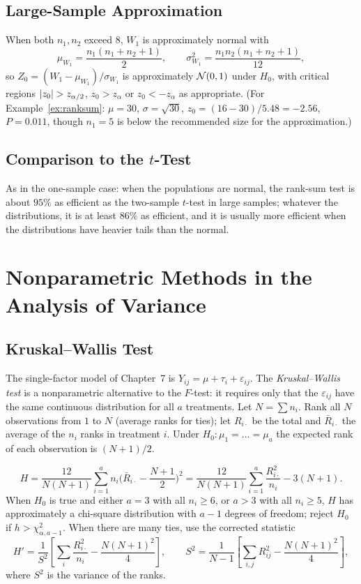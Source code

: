 \subsection{Large-Sample Approximation}

When both $n_1,n_2$ exceed $8$, $W_1$ is approximately normal with
\[ \mu_{W_1}=\frac{n_1(n_1+n_2+1)}2,\qquad\sigma^2_{W_1}=\frac{n_1n_2(n_1+n_2+1)}{12}, \]
so $Z_0=(W_1-\mu_{W_1})/\sigma_{W_1}$ is approximately $\mathcal{N}(0,1)$ under $H_0$, with critical regions $\lvert z_0\rvert>z_{\alpha/2}$, $z_0>z_\alpha$ or $z_0<-z_\alpha$ as appropriate. (For Example~\ref{ex:ranksum}: $\mu=30$, $\sigma=\sqrt{30}$, $z_0=(16-30)/5.48=-2.56$, $P=0.011$, though $n_1=5$ is below the recommended size for the approximation.)

\subsection{Comparison to the $t$-Test}

As in the one-sample case: when the populations are normal, the rank-sum test is about $95\%$ as efficient as the two-sample $t$-test in large samples; whatever the distributions, it is at least $86\%$ as efficient, and it is usually more efficient when the distributions have heavier tails than the normal.

\section{Nonparametric Methods in the Analysis of Variance}

\subsection{Kruskal--Wallis Test}

The single-factor model of Chapter~7 is $Y_{ij}=\mu+\tau_i+\varepsilon_{ij}$. The \emph{Kruskal--Wallis test} is a nonparametric alternative to the $F$-test: it requires only that the $\varepsilon_{ij}$ have the same continuous distribution for all $a$ treatments. Let $N=\sum n_i$. Rank all $N$ observations from $1$ to $N$ (average ranks for ties); let $R_{i\cdot}$ be the total and $\bar{R}_{i\cdot}$ the average of the $n_i$ ranks in treatment $i$. Under $H_0:\mu_1=\dots=\mu_a$ the expected rank of each observation is $(N+1)/2$.

\begin{theorem}\label{thm:kw}
\[ H=\frac{12}{N(N+1)}\sum_{i=1}^an_i\Big(\bar{R}_{i\cdot}-\frac{N+1}2\Big)^2=\frac{12}{N(N+1)}\sum_{i=1}^a\frac{R_{i\cdot}^2}{n_i}-3(N+1). \]
When $H_0$ is true and either $a=3$ with all $n_i\ge6$, or $a>3$ with all $n_i\ge5$, $H$ has approximately a chi-square distribution with $a-1$ degrees of freedom; reject $H_0$ if $h>\chi^2_{\alpha,a-1}$. When there are many ties, use the corrected statistic
\[ H'=\frac1{S^2}\left[\sum_i\frac{R_{i\cdot}^2}{n_i}-\frac{N(N+1)^2}4\right],\qquad S^2=\frac1{N-1}\left[\sum_{i,j}R_{ij}^2-\frac{N(N+1)^2}4\right], \]
where $S^2$ is the variance of the ranks.
\end{theorem}

